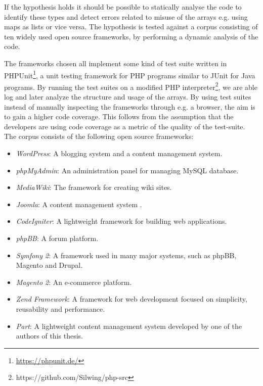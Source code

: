 If the hypothesis holds it should be possible to statically analyse the code to identify these types and detect errors related to misuse of the arrays e.g. using maps as lists or vice versa. The hypothesis is tested against a corpus consisting of ten widely used open source frameworks, by performing a dynamic analysis of the code.

The frameworks chosen all implement some kind of test suite written in PHPUnit\footnote{\url{https://phpunit.de/}}, a unit testing framework for PHP programs similar to JUnit for Java programs. By running the test suites on a modified PHP interpreter\footnote{https://github.com/Silwing/php-src}, we are able log and later analyze the structure and usage of the arrays. By using test suites instead of manually inspecting the frameworks through e.g. a browser, the aim is to gain a higher code coverage. This follows from the assumption that the developers are using code coverage as a metric of the quality of the test-suite. The corpus consists of the following open source frameworks:

\begin{itemize}
    \item \emph{WordPress}: A blogging system and a content management system.
    \item \emph{phpMyAdmin}: An administration panel for managing MySQL database.
    \item \emph{MediaWiki}: The framework for creating wiki sites.
    \item \emph{Joomla}: A content management system .
    \item \emph{CodeIgniter}: A lightweight framework for building web applications.
    \item \emph{phpBB}: A forum platform.
    \item \emph{Symfony 2}: A framework used in many major systems, such as phpBB, Magento and Drupal.
    \item \emph{Magento 2}: An e-commerce platform.
    \item \emph{Zend Framework}: A framework for web development focused on simplicity, reusability and performance.
    \item \emph{Part}: A lightweight content management system developed by one of the authors of this thesis.
\end{itemize}


